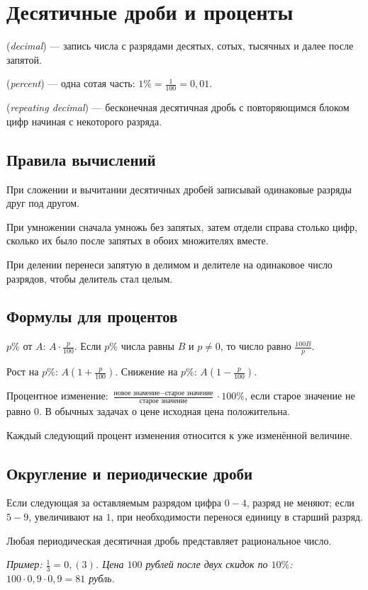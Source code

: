 \chapter{Десятичные дроби и проценты}\label{chap:c04}
\begin{definition} (\emph{decimal}) — запись числа с разрядами десятых, сотых, тысячных и далее после запятой.\end{definition}
\begin{definition} (\emph{percent}) — одна сотая часть: \(1 \% = \frac{1}{100} = 0{,}01\).\end{definition}
\begin{definition} (\emph{repeating decimal}) — бесконечная десятичная дробь с повторяющимся блоком цифр начиная с некоторого разряда.\end{definition}
\section{Правила вычислений}
При сложении и вычитании десятичных дробей записывай одинаковые разряды друг под другом.\par
При умножении сначала умножь без запятых, затем отдели справа столько цифр, сколько их было после запятых в обоих множителях вместе.\par
При делении перенеси запятую в делимом и делителе на одинаковое число разрядов, чтобы делитель стал целым.\par
\section{Формулы для процентов}
\(p \%\) от \(A\): \(A \cdot \frac{p}{100}\). Если \(p \%\) числа равны \(B\) и \(p \ne  0\), то число равно \(\frac{100 B}{p}\).\par
Рост на \(p \%\): \(A (1 + \frac{p}{100})\). Снижение на \(p \%\): \(A (1 - \frac{p}{100})\).\par
Процентное изменение: \(\frac{\text{новое значение} - \text{старое значение}}{\text{старое значение}} \cdot 100 \%\), если старое значение не равно \(0\). В обычных задачах о цене исходная цена положительна.\par
Каждый следующий процент изменения относится к уже изменённой величине.\par
\section{Округление и периодические дроби}
Если следующая за оставляемым разрядом цифра \(0 - 4\), разряд не меняют; если \(5 - 9\), увеличивают на \(1\), при необходимости перенося единицу в старший разряд.\par
Любая периодическая десятичная дробь представляет рациональное число.\par
{\small\textit{Пример: \(\frac{1}{3} = 0{,}(3)\). Цена \(100\) рублей после двух скидок по \(10 \%\): \(100 \cdot 0{,}9 \cdot 0{,}9 = 81\) рубль.}}\par
